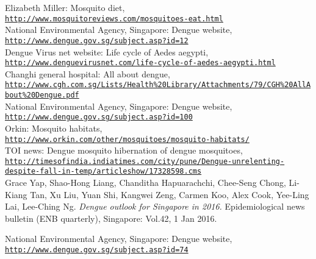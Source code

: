 \documentclass[11pt]{exam}
\begin{document}
\begin{thebibliography}{28}
Elizabeth Miller: Mosquito diet, 
\\\texttt{\url{http://www.mosquitoreviews.com/mosquitoes-eat.html}}\\
 
National Environmental Agency, Singapore: Dengue website, 
\\\texttt{\url{http://www.dengue.gov.sg/subject.asp?id=12}}\\

Dengue Virus net website: Life cycle of Aedes aegypti,
\\\texttt{\url{http://www.denguevirusnet.com/life-cycle-of-aedes-aegypti.html}}\\
 
Changhi general hospital: All about dengue,
\\\texttt{\url{http://www.cgh.com.sg/Lists/Health\%20Library/Attachments/79/CGH\%20AllAbout\%20Dengue.pdf}
} \\
 
National Environmental Agency, Singapore: Dengue website, 
\\\texttt{\url{http://www.dengue.gov.sg/subject.asp?id=100}}\\
 
Orkin: Mosquito habitats,
\\\texttt{\url{http://www.orkin.com/other/mosquitoes/mosquito-habitats/}}\\
 
TOI news: Dengue mosquito hibernation of dengue mosquitoes,
\\\texttt{\url{http://timesofindia.indiatimes.com/city/pune/Dengue-unrelenting-despite-fall-in-temp/articleshow/17328598.cms}}\\
 
Grace Yap, Shao-Hong Liang, Chanditha Hapuarachchi, Chee-Seng Chong, Li-Kiang Tan, Xu Liu, Yuan Shi, Kangwei Zeng, Carmen Koo, Alex Cook, Yee-Ling Lai, Lee-Ching Ng.
\textit{Dengue outlook for Singapore in 2016.}
Epidemiological news bulletin (ENB quarterly), Singapore: Vol.42, 1 Jan 2016.

National Environmental Agency, Singapore: Dengue website,
\\\texttt{\url{http://www.dengue.gov.sg/subject.asp?id=74}}\\
 

\end{thebibliography}
\end{document}
